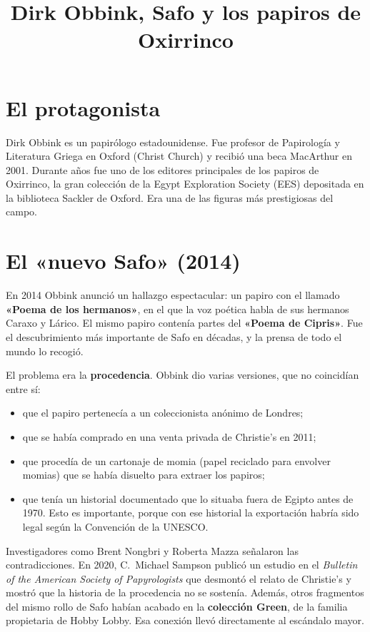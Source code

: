 \documentclass[11pt,a4paper]{article}
\title{Dirk Obbink, Safo y los papiros de Oxirrinco}
\author{}
\date{}
\begin{document}
\maketitle

\section*{El protagonista}

Dirk Obbink es un papirólogo estadounidense. Fue profesor de Papirología y Literatura Griega en Oxford (Christ Church) y recibió una beca MacArthur en 2001. Durante años fue uno de los editores principales de los papiros de Oxirrinco, la gran colección de la Egypt Exploration Society (EES) depositada en la biblioteca Sackler de Oxford. Era una de las figuras más prestigiosas del campo.

\section*{El «nuevo Safo» (2014)}

En 2014 Obbink anunció un hallazgo espectacular: un papiro con el llamado \textbf{«Poema de los hermanos»}, en el que la voz poética habla de sus hermanos Caraxo y Lárico. El mismo papiro contenía partes del \textbf{«Poema de Cipris»}. Fue el descubrimiento más importante de Safo en décadas, y la prensa de todo el mundo lo recogió.

El problema era la \textbf{procedencia}. Obbink dio varias versiones, que no coincidían entre sí:
\begin{itemize}[nosep]
  \item que el papiro pertenecía a un coleccionista anónimo de Londres;
  \item que se había comprado en una venta privada de Christie's en 2011;
  \item que procedía de un cartonaje de momia (papel reciclado para envolver momias) que se había disuelto para extraer los papiros;
  \item que tenía un historial documentado que lo situaba fuera de Egipto antes de 1970. Esto es importante, porque con ese historial la exportación habría sido legal según la Convención de la UNESCO.
\end{itemize}

Investigadores como Brent Nongbri y Roberta Mazza señalaron las contradicciones. En 2020, C.~Michael Sampson publicó un estudio en el \emph{Bulletin of the American Society of Papyrologists} que desmontó el relato de Christie's y mostró que la historia de la procedencia no se sostenía. Además, otros fragmentos del mismo rollo de Safo habían acabado en la \textbf{colección Green}, de la familia propietaria de Hobby Lobby. Esa conexión llevó directamente al escándalo mayor.
\end{document}
